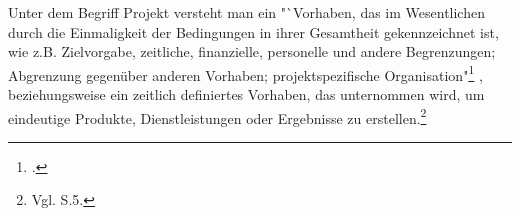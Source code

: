 Unter dem Begriff Projekt versteht man ein "`Vorhaben, das im Wesentlichen durch die Einmaligkeit der Bedingungen in ihrer
Gesamtheit gekennzeichnet ist, wie z.B. Zielvorgabe, zeitliche, finanzielle,
personelle und andere Begrenzungen; Abgrenzung gegenüber anderen Vorhaben;
projektspezifische Organisation"\footnote{\cite{DIN.200901}.}
, beziehungsweise ein zeitlich definiertes Vorhaben, das unternommen wird, um eindeutige Produkte, Dienstleistungen oder Ergebnisse zu erstellen.\footnote{Vgl. \cite{ProjectManagementInstitute.2008} S.5.}